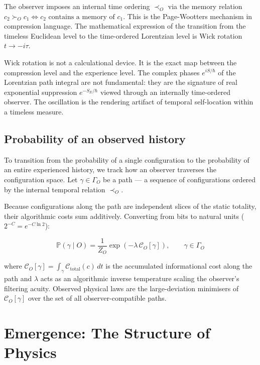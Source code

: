 \documentclass[12pt,a4paper]{article}
\newcommand{\Ctotal}{\mathcal{C}_{\mathrm{total}}}
\begin{document}
The observer imposes an internal time ordering $\prec_O$ via the memory relation $c_2 \succ_O c_1 \iff c_2 \text{ contains a memory of } c_1$. This is the Page-Wootters mechanism in compression language. The mathematical expression of the transition from the timeless Euclidean level to the time-ordered Lorentzian level is Wick rotation $t \to -i\tau$.

Wick rotation is not a calculational device. It is the exact map between the compression level and the experience level. The complex phases $e^{iS/\hbar}$ of the Lorentzian path integral are not fundamental: they are the signature of real exponential suppression $e^{-S_E/\hbar}$ viewed through an internally time-ordered observer. The oscillation is the rendering artifact of temporal self-location within a timeless measure.



\subsection*{Probability of an observed history}

To transition from the probability of a single configuration to the probability
of an entire experienced history, we track how an observer traverses the
configuration space. Let $\gamma \in \Gamma_O$ be a path --- a sequence of
configurations ordered by the internal temporal relation $\prec_O$.

Because configurations along the path are independent slices of the static
totality, their algorithmic costs sum additively. Converting from bits to
natural units ($2^{-C} = e^{-C\ln 2}$):

\begin{equation}
\boxed{
\mathbb{P}(\gamma \mid O)
= \frac{1}{Z_O} \exp\!\left(-\lambda\,\mathcal{C}_O[\gamma]\right),
\qquad \gamma \in \Gamma_O
}
\end{equation}

where $\mathcal{C}_O[\gamma] = \int_\gamma \Ctotal(c)\,dt$ is the accumulated
informational cost along the path and $\lambda$ acts as an algorithmic inverse
temperature scaling the observer's filtering acuity. Observed physical laws are
the large-deviation minimisers of $\mathcal{C}_O[\gamma]$ over the set of all
observer-compatible paths.

\section{Emergence: The Structure of Physics}
\label{sec:emergence}
\end{document}
